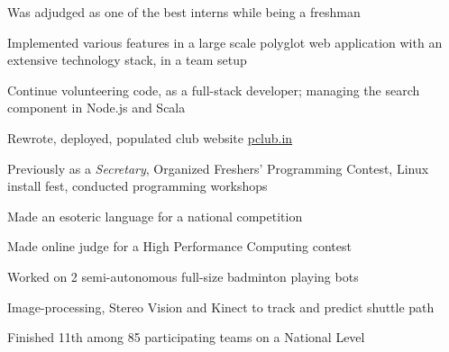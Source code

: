 \documentclass[a4paper]{deedy-resume} %
\begin{document}
\begin{minipage}[t]{0.66\textwidth}
  \sectionspace

  \runsubsection{}

  \begin{tightitemize}
  \item Was adjudged as one of the best interns while being a freshman
  \item Implemented various features in a large scale polyglot web
    application with an extensive technology stack, in a team setup
  \item Continue volunteering code, as a full-stack developer;
    managing the search component in Node.js and Scala
  \end{tightitemize}

  \sectionspace

  \runsubsection{}
  \begin{tightitemize}
  \item Rewrote, deployed, populated club website \href{http://pclub.in}{pclub.in}
  \item Previously as a \textit{Secretary}, Organized Freshers'
    Programming Contest, Linux install fest, conducted
    programming workshops
  \end{tightitemize}

  \sectionspace

  \runsubsection{}
  \begin{tightitemize}
  \item Made an esoteric language for a national
    competition
  \item Made online judge for a High Performance Computing contest
  \end{tightitemize}


  \sectionspace

  \runsubsection{}
  \begin{tightitemize}
  \item Worked on 2 semi-autonomous full-size badminton playing bots
  \item Image-processing, Stereo Vision and Kinect to track and
    predict shuttle path
  \item Finished 11th among 85 participating teams on a National Level
  \end{tightitemize}


\end{minipage}
\end{document}
